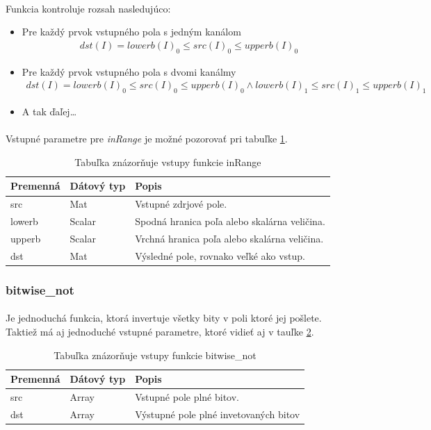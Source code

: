 \documentclass[12pt]{article}
\begin{document}
\paragraph{}
Funkcia kontroluje rozsah nasledujúco:
\begin{itemize}
  \item Pre každý prvok vstupného pola s jedným kanálom
	\begin{align*}
	dst(I) = lowerb(I)_0 \le src(I)_0 \le upperb(I)_0
	\end{align*}
  \item Pre každý prvok vstupného pola s dvomi kanálmy
  	\begin{align*}
	dst(I) = lowerb(I)_0 \le src(I)_0 \le upperb(I)_0 \wedge lowerb(I)_1 \le src(I)_1 \le upperb(I)_1
	\end{align*}
  \item A tak ďaľej\ldots
\end{itemize}
\paragraph{}
Vstupné parametre pre \emph{inRange} je možné pozorovať pri tabuľke \ref{inRangePar}. 
\cite{OpenCVDoc}
\begin{table}
	\centering
    \begin{tabular}{ | l | l | p{5cm} |}
    \hline
    Premenná & Dátový typ & Popis \\ \hline
    src & Mat & Vstupné zdrjové pole. \\ \hline
    lowerb & Scalar & Spodná hranica poľa alebo skalárna veličina. \\ \hline
    upperb & Scalar & Vrchná hranica poľa alebo skalárna veličina. \\ \hline
    dst & Mat & Výsledné pole, rovnako veľké ako vstup. \\
    \hline
    \end{tabular}
  	\caption{Tabuľka znázorňuje vstupy funkcie inRange}
  	\label{inRangePar}
\end{table}
\subsubsection{bitwise\_not}
\paragraph{}
Je jednoduchá funkcia, ktorá invertuje všetky bity v poli ktoré jej pošlete. Taktiež má aj jednoduché vstupné parametre, ktoré vidieť aj v tauľke \ref{bitwisePar}.
\cite{OpenCVDoc}
\begin{table}
	\centering
    \begin{tabular}{ | l | l | p{5cm} |}
    \hline
    Premenná & Dátový typ & Popis \\ \hline
    src & Array & Vstupné pole plné bitov. \\ \hline
    dst & Array & Výstupné pole plné invetovaných bitov \\
    \hline
    \end{tabular}
  	\caption{Tabuľka znázorňuje vstupy funkcie bitwise\_not}
  	\label{bitwisePar}
\end{table}
\end{document}
